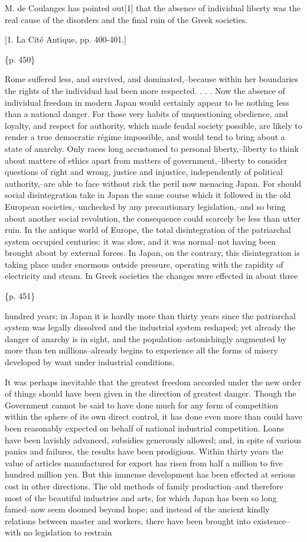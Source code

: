 M. de Coulanges has pointed out[1] that the absence of individual liberty was the real cause of the disorders and the final ruin of the Greek societies.

[1. La Cité Antique, pp. 400-401.]

\{p. 450\}

Rome suffered less, and survived, and dominated,--because within her boundaries the rights of the individual had been more respected. . . . Now the absence of individual freedom in modern Japan would certainly appear to be nothing less than a national danger. For those very habits of unquestioning obedience, and loyalty, and respect for authority, which made feudal society possible, are likely to render a true democratic régime impossible, and would tend to bring about a state of anarchy. Only races long accustomed to personal liberty,--liberty to think about matters of ethics apart from matters of government,--liberty to consider questions of right and wrong, justice and injustice, independently of political authority,--are able to face without risk the peril now menacing Japan. For should social disintegration take in Japan the same course which it followed in the old European societies,--unchecked by any precautionary legislation,--and so bring about another social revolution, the consequence could scarcely be less than utter ruin. In the antique world of Europe, the total disintegration of the patriarchal system occupied centuries: it was slow, and it was normal--not having been brought about by external forces. In Japan, on the contrary, this disintegration is taking place under enormous outside pressure, operating with the rapidity of electricity and steam. In Greek societies the changes were effected in about three

\{p. 451\}

hundred years; in Japan it is hardly more than thirty years since the patriarchal system was legally dissolved and the industrial system reshaped; yet already the danger of anarchy is in sight, and the population--astonishingly augmented by more than ten millions--already begins to experience all the forms of misery developed by want under industrial conditions.

It was perhaps inevitable that the greatest freedom accorded under the new order of things should have been given in the direction of greatest danger. Though the Government cannot be said to have done much for any form of competition within the sphere of its own direct control, it has done even more than could have been reasonably expected on behalf of national industrial competition. Loans have been lavishly advanced, subsidies generously allowed; and, in spite of various panics and failures, the results have been prodigious. Within thirty years the value of articles manufactured for export has risen from half a million to five hundred million yen. But this immense development has been effected at serious cost in other directions. The old methods of family production--and therefore most of the beautiful industries and arts, for which Japan has been so long famed--now seem doomed beyond hope; and instead of the ancient kindly relations between master and workers, there have been brought into existence--with no legislation to restrain

